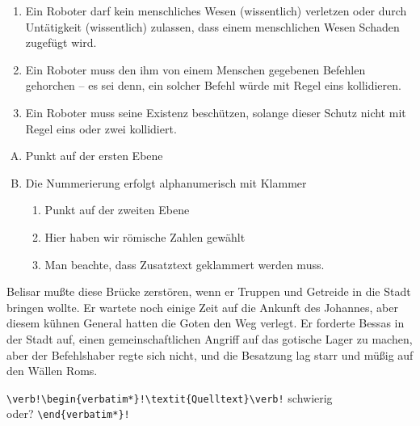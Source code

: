 \documentclass[a4paper, 12pt]{article} %
\begin{document}
\begin{enumerate}
    \item Ein Roboter darf kein menschliches Wesen (wissentlich)
     verletzen oder durch Untätigkeit (wissentlich) zulassen, dass
      einem menschlichen Wesen Schaden zugefügt wird.
    \item Ein Roboter muss den ihm von einem Menschen gegebenen
     Befehlen gehorchen – es sei denn, ein solcher Befehl
      würde mit Regel eins kollidieren.
    \item Ein Roboter muss seine Existenz beschützen, solange dieser 
    Schutz nicht mit Regel eins oder zwei kollidiert.
\end{enumerate}

\begin{enumerate}[A)]
    \item Punkt auf der ersten Ebene
    \item Die Nummerierung erfolgt alphanumerisch mit Klammer
    \begin{enumerate}[{Beispiel} i:]
        \item Punkt auf der zweiten Ebene
        \item Hier haben wir römische Zahlen gewählt
        \item Man beachte, dass Zusatztext geklammert werden muss.
    \end{enumerate}
\end{enumerate}

Belisar mußte diese Brücke zerstören, wenn er Truppen und Getreide
in die Stadt bringen wollte. Er wartete noch einige Zeit auf die
Ankunft des Johannes, aber diesem kühnen General hatten die
Goten den Weg verlegt. Er forderte Bessas in der  %
Stadt auf, einen gemeinschaftlichen Angriff auf das gotische
Lager zu machen, aber der Befehlshaber regte sich nicht, und die
Besatzung lag starr und müßig auf den Wällen Roms.

\verb+\verb!\begin{verbatim*}!\textit{Quelltext}\verb!+
    \textsf{\tiny schwierig\\ oder?}
    \verb+\end{verbatim*}!+
\end{document}
